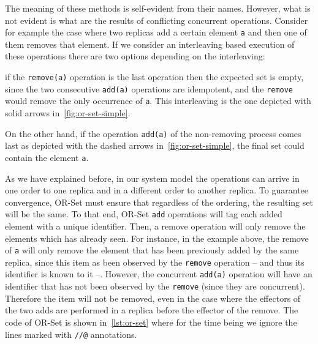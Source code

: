 The meaning of these methods is self-evident from their names.
%
However, what is not evident is what are the results of conflicting
concurrent operations.
%
Consider for example the case where two replicas add a certain element
\lstinline|a| and then one of them removes that element.
%
If we consider an interleaving based execution of these operations
there are two options depending on the interleaving:
\begin{inparaenum}[i)]
\item if the \lstinline|remove(a)| operation is the last operation
  then the expected set is empty, since the two consecutive
  \lstinline|add(a)| operations are idempotent, and the
  \lstinline|remove| would remove the only occurrence of
  \lstinline|a|. This interleaving is the one depicted with solid
  arrows in~\autoref{fig:or-set-simple}.
\item On the other hand, if the operation \lstinline|add(a)| of the
  non-removing process comes last as depicted with the dashed arrows
  in~\autoref{fig:or-set-simple}, the final set could contain the
  element \lstinline|a|.
\end{inparaenum}
As we have explained before, in our system model the operations can
arrive in one order to one replica and in a different order to another
replica.
%
To guarantee convergence, OR-Set must ensure that regardless of the
ordering, the resulting set will be the same.
%
To that end, OR-Set \lstinline|add| operations will tag each added
element with a unique identifier.
%
Then, a remove operation will only remove the elements which has
already seen.
%
For instance, in the example above, the remove of \lstinline|a| will
only remove the element that has been previously added by the same
replica, since this item as been observed by the \lstinline|remove|
operation -- and thus its identifier is known to it --. However, the
concurrent \lstinline|add(a)| operation will have an identifier that
has not been observed by the \lstinline|remove| (since they are
concurrent).
%
Therefore the item will not be removed, even in the case where the
effectors of the two adds are performed in a replica before the effector
of the remove.
%
The code of OR-Set is shown in~\autoref{lst:or-set} where for the time
being we ignore the lines marked with \lstinline|//@| annotations.


